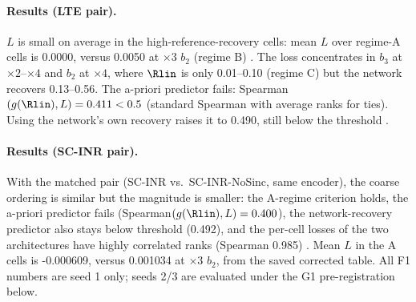 \paragraph{Results (LTE pair).} $L$ is small on average in the high-reference-recovery cells: mean $L$ over
regime-A cells is 0.0000, versus 0.0050 at $\times3$ $b_2$ (regime B)
. The loss concentrates in $b_3$ at $\times2$--$\times4$
and $b_2$ at $\times4$, where $\Rlin$ is only 0.01--0.10 (regime C) but the
network recovers 0.13--0.56. The a-priori predictor fails:
Spearman$(g(\Rlin),L)=0.411<0.5$ (standard Spearman with average ranks for
ties). Using the network's own recovery raises it to 0.490, still below the
threshold .

\paragraph{Results (SC-INR pair).} With the matched pair (SC-INR vs.\
SC-INR-NoSinc, same encoder), the coarse ordering is similar but the magnitude is smaller: the A-regime criterion
holds, the a-priori predictor fails (Spearman$(g(\Rlin),L)=0.400$), the
network-recovery predictor also stays below threshold (0.492), and the
per-cell losses of the two architectures have highly correlated ranks (Spearman 0.985)
\src{F1-corr2}. Mean $L$ in the A cells is -0.000609, versus 0.001034 at $\times3$ $b_2$, from the saved corrected table. All F1 numbers are seed 1 only; seeds 2/3
are evaluated under the G1 pre-registration below.


